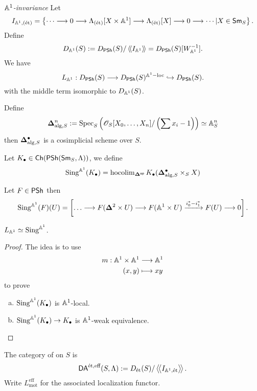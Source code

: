 \emph{$\mathbb A^{1}$-invariance}
Let
\[
I_{\Aff^{1},(\text{\'et})} = \left\{\cdots\to 0\to \Lambda_{(\text{\'et})}[X\times \Aff^{1}]\to
\Lambda_{(\text{\'et})}[X]\to 0\to \cdots | X\in \Sm_S\right\} .
\]
Define
\[
D_{\mathbb A^{1}}(S) := D_{\mathsf{PSh}}(S) / \left\langle\!\left\langle I_{\mathbb A^{1}} \right\rangle\!\right\rangle = D_{\mathsf{PSh}}(S)[W_{\mathbb A^{1}}^{-1}].
\]
We have
\[
L_{\Aff^{1}}: D_{\PSh}(S) \to D_{\PSh}(S)^{\Aff^{1}-\text{loc}} \injto D_{\PSh}(S).
\]
with the middle term isomorphic to $D_{\mathbb A^{1}}(S)$.

\begin{definition}
Define
\[
\mathbf{\Delta}^{n}_{\text{alg},S} := \operatorname{Spec}_S\left( \mathscr{O}_S[X_0,\dots,X_n] / \left( \sum
x_i-1 \right)  \right) \simeq \mathbb A_S^{n}
\]
then $\mathbf{\Delta}_{\text{alg},S}^{\bullet}$ is a cosimplicial scheme over $S$.
\end{definition}
\begin{definition}
Let $K_\bullet\in \mathsf{Ch}(\mathsf{PSh}(\mathsf{Sm}_S,\Lambda))$, we define
\[
\operatorname{Sing}^{\mathbb A^{1}}(K_\bullet) = \operatorname{hocolim}_{\mathbf{\Delta}^\mathsf{op}}
K_\bullet(\mathbf{\Delta}_{\text{alg},S}^{\bullet}\times_S X)
\]
\end{definition}
\begin{example}
Let $F\in \mathsf{PSh}$ then
\[
\Sing^{\Aff^{1}}(F)(U) = \left[ \dots \to  F(\bb{\Delta}^2\times U)\to F(\Aff^1\times
U) \xrightarrow{i_0^{*}-i_1^{*}}  F(U) \to 0 \right] .
\] 	
\end{example}
\begin{proposition}
$L_{\mathbb A^{1}}\simeq \operatorname{Sing}^{\mathbb A^{1}}$.
\end{proposition}
\begin{proof}
The idea is to use
\begin{align*}
m: \mathbb A^{1}\times \mathbb A^{1} &\longrightarrow \mathbb A^{1} \\
(x,y) &\longmapsto xy
\end{align*}
to prove
\begin{enumerate}[a)]
\item $\operatorname{Sing}^{\mathbb A^{1}}(K_\bullet)$ is $\mathbb A^{1}$-local.
\item $\Sing^{\Aff^{1}}(K_\bullet)\to K_\bullet$ is $\mathbb A^{1}$-weak equivalence.
\end{enumerate}
\end{proof}
\begin{definition}
The category of  on $S$ is
\[
\mathsf{DA}^{\text{\'et},\text{eff}}(S,\Lambda) := D_{\text{\'et}}(S) /
\left\langle\!\left\langle I_{\mathbb A^{1},\text{\'et}} \right\rangle\!\right\rangle.
\]
Write $L_{\text{mot}}^{\text{eff}}$ for the associated localization functor.
\end{definition}

